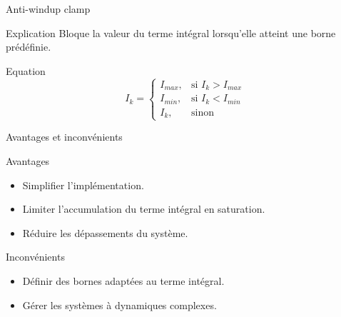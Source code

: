 \begin{frame}{Anti-windup clamp}
    \begin{block}{Explication}
        Bloque la valeur du terme intégral lorsqu'elle atteint une borne prédéfinie.
    \end{block}
    \begin{block}{Equation}
    $$
    I_{k} =
    \begin{cases}
        I_{max}, & \text{si } I_{k} > I_{max} \\
        I_{min}, & \text{si } I_{k} < I_{min} \\
        I_{k}, & \text{sinon}
    \end{cases}
    $$
    \end{block}
    
\end{frame}

\begin{frame}{Avantages et inconvénients}

    {
    
    \begin{block}{Avantages}
    \begin{itemize}
        \item Simplifier l'implémentation.
        \item Limiter l'accumulation du terme intégral en saturation.
        \item Réduire les dépassements du système.
    \end{itemize}
    \end{block}
    
    }
    
    
    \begin{block}{Inconvénients}
    
    \begin{itemize}
        \item Définir des bornes adaptées au terme intégral.
        \item Gérer les systèmes à dynamiques complexes.
    \end{itemize}
    \end{block}
\end{frame}

